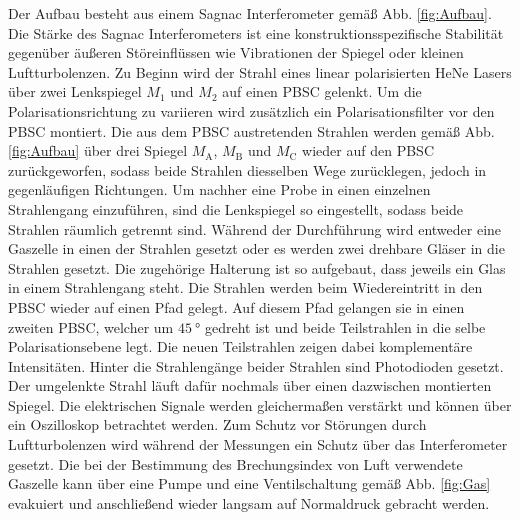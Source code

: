 Der Aufbau besteht aus einem Sagnac Interferometer gemäß Abb. \ref{fig:Aufbau}. Die Stärke des Sagnac Interferometers ist eine konstruktionsspezifische Stabilität gegenüber äußeren Störeinflüssen wie Vibrationen der Spiegel oder kleinen Luftturbolenzen. Zu Beginn wird der Strahl eines linear polarisierten HeNe Lasers über zwei Lenkspiegel $M_\text{1}$ und $M_\text{2}$ auf einen PBSC gelenkt. Um die Polarisationsrichtung zu variieren wird zusätzlich ein Polarisationsfilter vor den PBSC montiert. Die aus dem PBSC austretenden Strahlen werden gemäß Abb. \ref{fig:Aufbau} über drei Spiegel $M_\text{A}$, $M_\text{B}$ und $M_\text{C}$ wieder auf den PBSC zurückgeworfen, sodass beide Strahlen diesselben Wege zurücklegen, jedoch in gegenläufigen Richtungen. Um nachher eine Probe in einen einzelnen Strahlengang einzuführen, sind die Lenkspiegel so eingestellt, sodass beide Strahlen räumlich getrennt sind. Während der Durchführung wird entweder eine Gaszelle in einen der Strahlen gesetzt oder es werden zwei drehbare Gläser in die Strahlen gesetzt. Die zugehörige Halterung ist so aufgebaut, dass jeweils ein Glas in einem Strahlengang steht.%
Die Strahlen werden beim Wiedereintritt in den PBSC wieder auf einen Pfad gelegt. Auf diesem Pfad gelangen sie in einen zweiten PBSC, welcher um $\SI{45}{\degree}$ gedreht ist und beide Teilstrahlen in die selbe Polarisationsebene legt. 
Die neuen Teilstrahlen zeigen dabei komplementäre Intensitäten. Hinter die Strahlengänge beider Strahlen sind Photodioden gesetzt. Der umgelenkte Strahl läuft dafür nochmals über einen dazwischen montierten Spiegel. Die elektrischen Signale werden gleichermaßen verstärkt und können über ein Oszilloskop betrachtet werden. Zum Schutz vor Störungen durch Luftturbolenzen wird während der Messungen ein Schutz über das Interferometer gesetzt. Die bei der Bestimmung des Brechungsindex von Luft verwendete Gaszelle kann über eine Pumpe und eine Ventilschaltung gemäß Abb. \ref{fig:Gas} evakuiert und anschließend wieder langsam auf Normaldruck gebracht werden.

